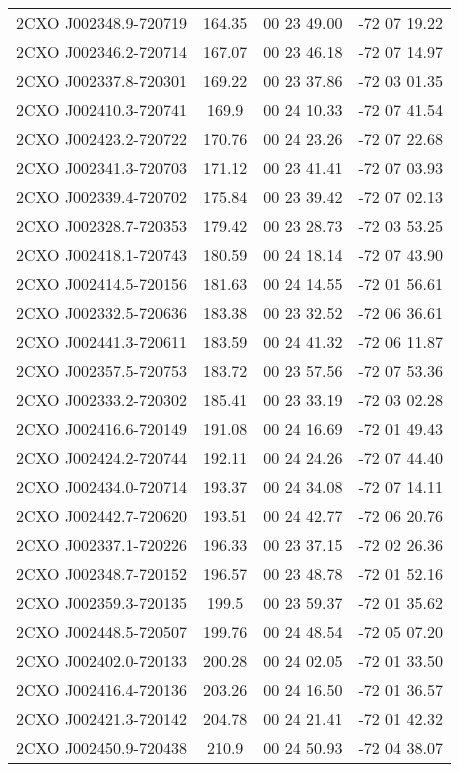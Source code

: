 \begin{table}
\begin{tabular}{cccc}
2CXO J002348.9-720719 & 164.35 & 00 23 49.00 & -72 07 19.22 \\
2CXO J002346.2-720714 & 167.07 & 00 23 46.18 & -72 07 14.97 \\
2CXO J002337.8-720301 & 169.22 & 00 23 37.86 & -72 03 01.35 \\
2CXO J002410.3-720741 & 169.9 & 00 24 10.33 & -72 07 41.54 \\
2CXO J002423.2-720722 & 170.76 & 00 24 23.26 & -72 07 22.68 \\
2CXO J002341.3-720703 & 171.12 & 00 23 41.41 & -72 07 03.93 \\
2CXO J002339.4-720702 & 175.84 & 00 23 39.42 & -72 07 02.13 \\
2CXO J002328.7-720353 & 179.42 & 00 23 28.73 & -72 03 53.25 \\
2CXO J002418.1-720743 & 180.59 & 00 24 18.14 & -72 07 43.90 \\
2CXO J002414.5-720156 & 181.63 & 00 24 14.55 & -72 01 56.61 \\
2CXO J002332.5-720636 & 183.38 & 00 23 32.52 & -72 06 36.61 \\
2CXO J002441.3-720611 & 183.59 & 00 24 41.32 & -72 06 11.87 \\
2CXO J002357.5-720753 & 183.72 & 00 23 57.56 & -72 07 53.36 \\
2CXO J002333.2-720302 & 185.41 & 00 23 33.19 & -72 03 02.28 \\
2CXO J002416.6-720149 & 191.08 & 00 24 16.69 & -72 01 49.43 \\
2CXO J002424.2-720744 & 192.11 & 00 24 24.26 & -72 07 44.40 \\
2CXO J002434.0-720714 & 193.37 & 00 24 34.08 & -72 07 14.11 \\
2CXO J002442.7-720620 & 193.51 & 00 24 42.77 & -72 06 20.76 \\
2CXO J002337.1-720226 & 196.33 & 00 23 37.15 & -72 02 26.36 \\
2CXO J002348.7-720152 & 196.57 & 00 23 48.78 & -72 01 52.16 \\
2CXO J002359.3-720135 & 199.5 & 00 23 59.37 & -72 01 35.62 \\
2CXO J002448.5-720507 & 199.76 & 00 24 48.54 & -72 05 07.20 \\
2CXO J002402.0-720133 & 200.28 & 00 24 02.05 & -72 01 33.50 \\
2CXO J002416.4-720136 & 203.26 & 00 24 16.50 & -72 01 36.57 \\
2CXO J002421.3-720142 & 204.78 & 00 24 21.41 & -72 01 42.32 \\
2CXO J002450.9-720438 & 210.9 & 00 24 50.93 & -72 04 38.07 \\

\end{tabular}
\end{table}

